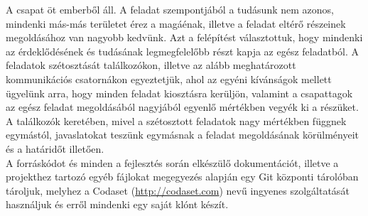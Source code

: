 A csapat öt emberből áll. A feladat szempontjából a tudásunk nem azonos, mindenki más-más területet érez a magáénak, illetve a feladat eltérő részeinek megoldásához van nagyobb kedvünk. Azt a felépítést választottuk, hogy mindenki az érdeklődésének és tudásának legmegfelelőbb részt kapja az egész feladatból. A feladatok szét\-osztását találkozókon, illetve az alább meghatározott kommunikációs csatornákon egyeztetjük, ahol az egyéni kívánságok mellett ügyelünk arra, hogy minden feladat kiosztásra kerüljön, valamint a csapattagok az egész feladat megoldásából nagyjából egyenlő mértékben vegyék ki a részüket. A találkozók keretében, mivel a szét\-osztott feladatok nagy mértékben függnek egymástól, javaslatokat teszünk egymásnak a feladat megoldásának körülményeit és a határidőt illetően.\\

A forráskódot és minden a fejlesztés során elkészülő dokumentációt, illetve a projekthez tartozó egyéb fájlokat megegyezés alapján egy Git központi tárolóban tároljuk, melyhez a Codaset (\url{http://codaset.com}) nevű ingyenes szolgáltatását használjuk és erről mindenki egy saját klónt készít.\\


